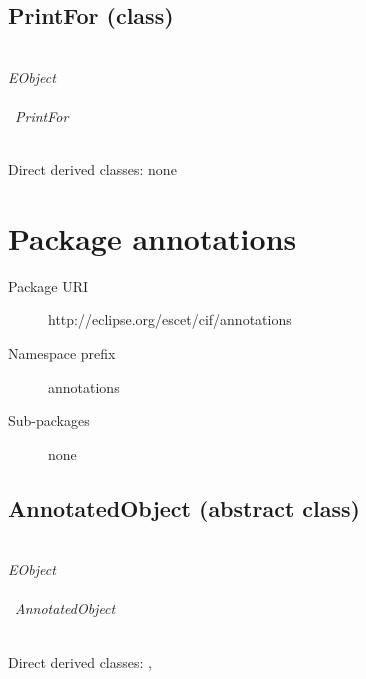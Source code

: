 \subsection{PrintFor (class)}\label{cifclass:PrintFor}
\clsdocuPrintFor

~\\ \noindent \emph{EObject} \\
\hook~ \\
\hookindent\hook~\emph{PrintFor}

~\\ \noindent Direct derived classes:
none

\begin{description}
{\featdocuPositionObjectposition}
{\featdocuPrintForevent}
{\featdocuPrintForkind}
\end{description}



\section{Package annotations}\label{cifpkg:annotations}
\pkgdocuannotations

\begin{description}
\item[Package URI] http://eclipse.org/escet/cif/annotations
\item[Namespace prefix] annotations
\item[Sub-packages] none
\end{description}

\subsection{AnnotatedObject (abstract class)}\label{cifclass:AnnotatedObject}
\clsdocuAnnotatedObject

~\\ \noindent \emph{EObject} \\
\hook~ \\
\hookindent\hook~\emph{AnnotatedObject}

~\\ \noindent Direct derived classes:
, 

